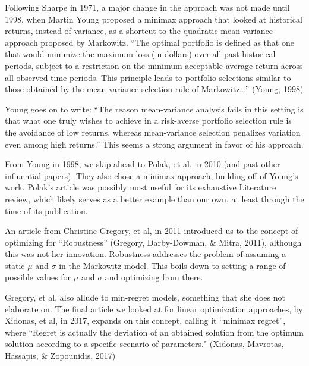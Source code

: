 \documentclass[12pt]{article} %
\begin{document}
Following Sharpe in 1971, a major change in the approach was not made until 1998, when Martin Young proposed a minimax approach that looked at historical returns, instead of variance, as a shortcut to the quadratic mean-variance approach proposed by Markowitz. ``The optimal portfolio is defined as that one that would minimize the maximum loss (in dollars) over all past historical periods, subject to a restriction on the minimum acceptable average return across all observed time periods. This principle leads to portfolio selections similar to those obtained by the mean-variance selection rule of Markowitz…” (Young, 1998)

Young goes on to write: ``The reason mean-variance analysis fails in this setting is that what one truly wishes to achieve in a risk-averse portfolio selection rule is the avoidance of low returns, whereas mean-variance selection penalizes variation even among high returns.” This seems a strong argument in favor of his approach.

From Young in 1998, we skip ahead to Polak, et al. in 2010 (and past other influential papers). They also chose a minimax approach, building off of Young’s work. Polak’s article was possibly most useful for its exhaustive Literature review, which likely serves as a better example than our own, at least through the time of its publication.

An article from Christine Gregory, et al, in 2011 introduced us to the concept of optimizing for ``Robustness” (Gregory, Darby-Dowman, \& Mitra, 2011), although this was not her innovation. Robustness addresses the problem of assuming a static $\mu$ and $\sigma$ in the Markowitz model. This boils down to setting a range of possible values for $\mu$ and $\sigma$ and optimizing from there.

Gregory, et al, also allude to min-regret models, something that she does not elaborate on. The final article we looked at for linear optimization approaches, by Xidonas, et al, in 2017, expands on this concept, calling it ``minimax regret”, where ``Regret is actually the deviation of an obtained solution from the optimum solution according to a specific scenario of parameters." (Xidonas, Mavrotas, Hassapis, \& Zopounidis, 2017)
\end{document}
